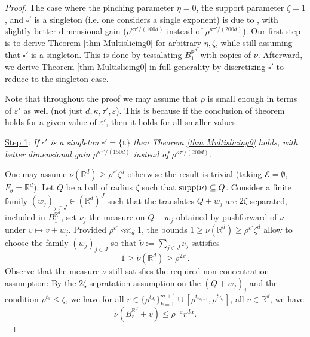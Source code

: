 \documentclass[11pt, leqno, fleqn]{amsart}
\def\eps{\varepsilon}
\newcommand{\margem}[1]{\marginpar{{\scriptsize {#1}}}}
\def\cE{          \mathcal E}
\def\clo{   \color{orange}}
\def\bt{        \mathbf{t}}
\def \R{{\mathbb R}}
\theoremstyle{definition}
\theoremstyle{definition}
\def\supp{{\rm supp}}
\begin{document}

			
			\bigskip	 
		 \begin{proof} %
		  The case where the pinching parameter $\eta=0$, the support parameter $\zeta=1$, and  $\square'$ is a singleton (i.e. one considers a single exponent) is due to \cite[Theorem 3.4]{BH2},  with slightly better dimensional gain  ($\rho^{\kappa \tau'/( 100 d) } $ instead of $\rho^{\kappa \tau'/( 200 d)}$). Our first step is to derive  Theorem \ref{thm Multislicing0} for arbitrary $\eta, \zeta$, while still assuming that $\square'$ is a singleton. This is done by tessalating $B^{\R^d}_1$ with copies of $\nu$.  Afterward, we  derive  Theorem \ref{thm Multislicing0} in full generality  by discretizing $\square'$ to reduce to the singleton case. 
		  
		  Note that throughout  the proof we may assume that $\rho$  is small enough in terms of $\eps'$ as well (not just $d, \kappa, \tau', \eps$). This is because if the conclusion of theorem holds for a given value of $\eps'$, then it holds for all smaller values.

		 
		 \bigskip
		 \noindent \underline{Step 1}: \emph{If $\square'$ is a singleton $\square'=\{\bt\}$ then Theorem \ref{thm Multislicing0} holds, with better dimensional gain $\rho^{\kappa \tau'/( 150 d) } $ instead of $\rho^{\kappa \tau'/( 200 d) }$.}
		 
%		 
		
		 One may assume $\nu(\R^d)\geq \rho^{\eps'}\zeta^{d}$ otherwise the result is trivial (taking $\cE=\emptyset$, $F_{\theta}=\R^d$). Let $Q$ be a ball of radius $\zeta$ such that $\supp (\nu) \subseteq Q$. Consider a finite family $(w_{j})_{j\in J}\in (\R^d)^J$ such that the translates $Q+ w_{j}$ are $2\zeta$-separated, included in $B^{\R^d}_{1}$, set $\nu_{j}$ the measure on $Q+w_{j}$ obtained by pushforward of $\nu$ under $v \mapsto v+w_{j}$. Provided $\rho^{\eps'}\lll_{d}1$, the  bounds  $1\geq \nu(\R^d)\geq \rho^{\eps'}\zeta^{d}$ allow to choose the family $(w_{j})_{j\in J}$ so that $\tilde\nu:=\sum_{j\in J}\nu_{j}$ satisfies
		 $$1\geq \tilde\nu(\R^d)\geq \rho^{2\eps'}. $$
		 Observe that the measure $\tilde\nu$ still satisfies the required non-concentration assumption: By the $2\zeta$-sepratation assumption on the $(Q+w_{j})_{j}$ and the condition $ \rho^{t_{1}}\leq \zeta$, we have for all $r \in \{\rho^{t_{d_k}}\}_{k=1}^{m+1}\cup [  \rho^{t_{d_{k_{0}+1}}}, \rho^{t_{ d_{k_{0}}}} ]$, all $v \in \R^d$,  we have
	$$\tilde{\nu}(B^{\R^d}_{r}+v)\leq\rho^{-\eps} r^{d\alpha}.$$
	

\end{proof}
\end{document}
